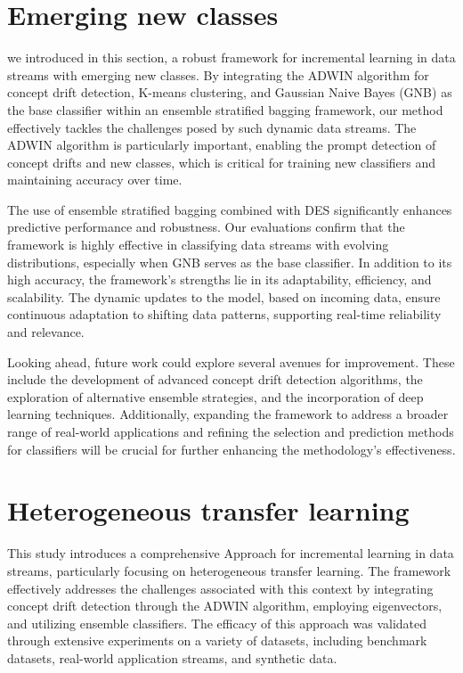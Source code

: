 \section{Emerging new classes}
\label{section:7_2}
we introduced in this section, a robust framework for incremental learning in data streams with emerging new classes. By integrating the ADWIN algorithm for concept drift detection, K-means clustering, and Gaussian Naive Bayes (GNB) as the base classifier within an ensemble stratified bagging framework, our method effectively tackles the challenges posed by such dynamic data streams. The ADWIN algorithm is particularly important, enabling the prompt detection of concept drifts and new classes, which is critical for training new classifiers and maintaining accuracy over time.

The use of ensemble stratified bagging combined with DES significantly enhances predictive performance and robustness. Our evaluations confirm that the framework is highly effective in classifying data streams with evolving distributions, especially when GNB serves as the base classifier. In addition to its high accuracy, the framework's strengths lie in its adaptability, efficiency, and scalability. The dynamic updates to the model, based on incoming data, ensure continuous adaptation to shifting data patterns, supporting real-time reliability and relevance.

Looking ahead, future work could explore several avenues for improvement. These include the development of advanced concept drift detection algorithms, the exploration of alternative ensemble strategies, and the incorporation of deep learning techniques. Additionally, expanding the framework to address a broader range of real-world applications and refining the selection and prediction methods for classifiers will be crucial for further enhancing the methodology's effectiveness.

\section{Heterogeneous transfer learning}
\label{section:7_2}

This study introduces a comprehensive Approach for incremental learning in data streams, particularly focusing on heterogeneous transfer learning. The framework effectively addresses the challenges associated with this context by integrating concept drift detection through the ADWIN algorithm, employing eigenvectors, and utilizing ensemble classifiers. The efficacy of this approach was validated through extensive experiments on a variety of datasets, including benchmark datasets, real-world application streams, and synthetic data.

